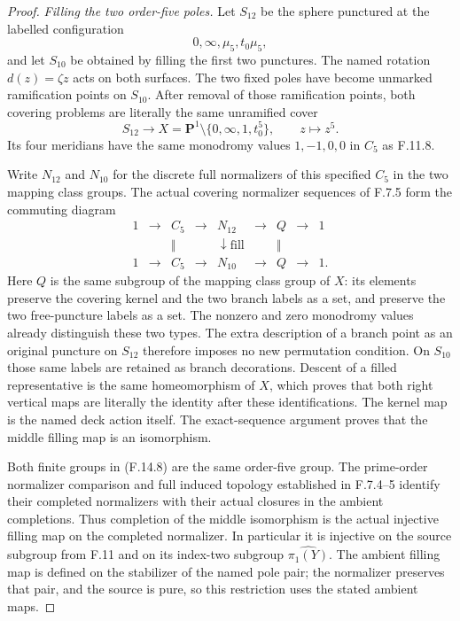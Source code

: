 \begin{proof}
\emph{Filling the two order-five poles.}
Let $S_{12}$ be the sphere punctured at the labelled
configuration
\[
                  0,\infty,\mu_5,t_0\mu_5,
\]
and let $S_{10}$ be obtained by filling the first two
punctures.  The named rotation $d(z)=\zeta z$ acts on
both surfaces.  The two fixed poles have become
unmarked ramification points on $S_{10}$.
After removal of those ramification points, both
covering problems are literally the same unramified
cover
\[
 S_{12}\longrightarrow
       X=\mathbf P^1\setminus\{0,\infty,1,t_0^5\},
                           \qquad z\longmapsto z^5 .
                                                               \tag{F.14.7}
\]
Its four meridians have the same monodromy values
$1,-1,0,0$ in $C_5$ as F.11.8.

Write $N_{12}$ and $N_{10}$ for the discrete full
normalizers of this specified $C_5$ in the two
mapping class groups.  The actual covering normalizer
sequences of F.7.5 form the commuting diagram
\[
\begin{array}{ccccccccc}
1&\longrightarrow&C_5&\longrightarrow&N_{12}
 &\longrightarrow&Q&\longrightarrow&1\\
 &&\Vert&&\downarrow\mathrm{fill}&&\Vert\\
1&\longrightarrow&C_5&\longrightarrow&N_{10}
 &\longrightarrow&Q&\longrightarrow&1 .
\end{array}                                                     \tag{F.14.8}
\]
Here $Q$ is the same subgroup of the mapping class
group of $X$: its elements preserve the covering
kernel and the two branch labels as a set, and
preserve the two free-puncture labels as a set.
The nonzero and zero monodromy values already
distinguish these two types.  The extra description
of a branch point as an original puncture on
$S_{12}$ therefore imposes no new permutation
condition.  On $S_{10}$ those same labels are retained
as branch decorations.  Descent of a filled
representative is the same homeomorphism of $X$,
which proves that both right vertical maps are
literally the identity after these identifications.
The kernel map is the named deck action itself.
The exact-sequence argument proves that the middle
filling map is an isomorphism.

Both finite groups in (F.14.8) are the same order-five
group.  The prime-order normalizer comparison and
full induced topology established in F.7.4--5 identify
their completed normalizers with their actual
closures in the ambient completions.  Thus completion
of the middle isomorphism is the actual injective
filling map on the completed normalizer.  In
particular it is injective on the source subgroup
from F.11 and on its index-two subgroup
$\widehat{\pi_1(Y)}$.
The ambient filling map is defined on the stabilizer
of the named pole pair; the normalizer preserves
that pair, and the source is pure, so this restriction
uses the stated ambient maps.


\end{proof}
